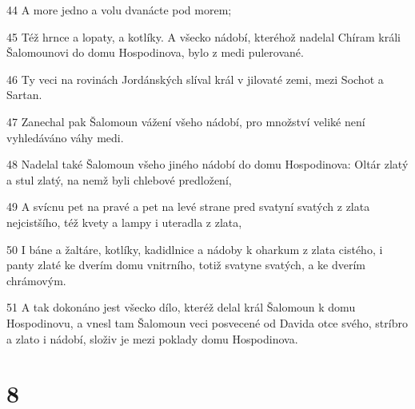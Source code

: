 \par 44 A more jedno a volu dvanácte pod morem;
\par 45 Též hrnce a lopaty, a kotlíky. A všecko nádobí, kteréhož nadelal Chíram králi Šalomounovi do domu Hospodinova, bylo z medi pulerované.
\par 46 Ty veci na rovinách Jordánských slíval král v jilovaté zemi, mezi Sochot a Sartan.
\par 47 Zanechal pak Šalomoun vážení všeho nádobí, pro množství veliké není vyhledáváno váhy medi.
\par 48 Nadelal také Šalomoun všeho jiného nádobí do domu Hospodinova: Oltár zlatý a stul zlatý, na nemž byli chlebové predložení,
\par 49 A svícnu pet na pravé a pet na levé strane pred svatyní svatých z zlata nejcistšího, též kvety a lampy i uteradla z zlata,
\par 50 I báne a žaltáre, kotlíky, kadidlnice a nádoby k oharkum z zlata cistého, i panty zlaté ke dverím domu vnitrního, totiž svatyne svatých, a ke dverím chrámovým.
\par 51 A tak dokonáno jest všecko dílo, kteréž delal král Šalomoun k domu Hospodinovu, a vnesl tam Šalomoun veci posvecené od Davida otce svého, stríbro a zlato i nádobí, složiv je mezi poklady domu Hospodinova.

\chapter{8}

